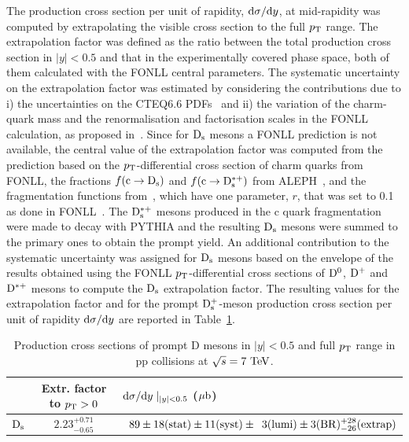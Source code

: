 The production cross section per unit of rapidity, ${\rm d}\sigma/{\rm d}y$, 
at mid-rapidity was computed by extrapolating the 
visible cross section to the full $p_{\rm T}$ range.
The extrapolation factor was defined as
the ratio between the total production cross section in $|y|<0.5$ and that 
in the experimentally covered phase space, both of them calculated with the
FONLL central parameters. 
The systematic uncertainty on the extrapolation factor was estimated by
considering the contributions due to i) the uncertainties on the 
CTEQ6.6 PDFs~\cite{Pumplin:2002vw} and ii) the variation of the charm-quark 
mass and the renormalisation and factorisation scales in the FONLL 
calculation, as proposed in~\cite{Cacciari:2012ny}.
Since for ${\rm D_s}$ mesons a FONLL prediction is not available,
the central value of the extrapolation factor was computed 
from the prediction based on the $p_{\rm T}$-differential cross section of charm 
quarks from FONLL, the fractions $f({\rm c\rightarrow {\rm D_s}})$ and 
$f({\rm c\rightarrow D_{\rm s}^{*+}})$ from ALEPH~\cite{Barate:1999bg}, and the 
fragmentation functions from~\cite{Braaten:1994bz}, which have one parameter, 
$r$, that was set to 0.1 as done in FONLL~\cite{Cacciari:2003zu}.
The ${\rm D}_{\rm s}^{*+}$ mesons produced in the c quark fragmentation were 
made to decay with PYTHIA and the resulting ${\rm D_s}$ mesons were summed to the 
primary ones to obtain the prompt yield.
An additional contribution to the systematic uncertainty  was assigned
for ${\rm D_s}$ mesons based on the envelope of the results obtained using the 
FONLL $p_{\rm T}$-differential cross sections of ${\rm D^0}$, 
${\rm D^+}$ and ${\rm D^{*+}}$ mesons to compute the ${\rm D_s}$ extrapolation factor.
The resulting values for the extrapolation factor and for the prompt ${\rm D_s^+}$-meson 
production cross section per unit of rapidity ${\rm d}\sigma/{\rm d}y$ are 
reported in Table~\ref{tab:dsdy}.
\begin{table}[!h]
\centering
\begin{tabular}{c|c|l} 
 & Extr. factor to $p_{\rm T}>0$ & ${\rm d}\sigma/{\rm d}y \mid_{|y|<0.5}$ ($\mathrm{\mu b}$) \\
\hline
\rule{0pt}{12pt} 
${\rm D_s}$     & $2.23^{+0.71}_{-0.65}$ &  $\phantom{0}89 \pm 18 ({\rm stat}) \pm 11 ({\rm syst}) \pm \phantom{0}3 ({\rm lumi}) \pm 3 ({\rm BR})^{+28}_{-26} ({\rm extrap})$\\[1ex]
\hline
\end{tabular}
\caption{Production cross sections of prompt D mesons in $|y| < 0.5$ and full $p_{\rm T}$ range in pp collisions at $\sqrt{s} = 7~\mathrm{TeV}$.}
\label{tab:dsdy}
\end{table}
